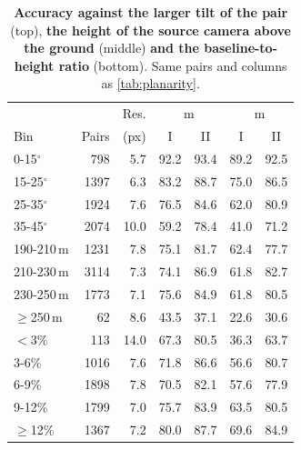\begin{table}[t]
\centering
\caption{\textbf{Accuracy against the larger tilt of the pair} (top), \textbf{the height of the source camera above the ground} (middle) \textbf{and the baseline-to-height ratio} (bottom). Same pairs and columns as \cref{tab:planarity}.}
\label{tab:planarity_tilt}
\footnotesize
\setlength{\tabcolsep}{4pt}
\begin{tabular}{@{}lrrcccc@{}}
\toprule
& & Res. & \multicolumn{2}{c}{\SRd@1\,m} & \multicolumn{2}{c}{\SRe@1\,m} \\
Bin & Pairs & (px) & I & II & I & II \\
\midrule
0-15$^\circ$ & 798 & 5.7 & 92.2 & 93.4 & 89.2 & 92.5 \\
15-25$^\circ$ & 1397 & 6.3 & 83.2 & 88.7 & 75.0 & 86.5 \\
25-35$^\circ$ & 1924 & 7.6 & 76.5 & 84.6 & 62.0 & 80.9 \\
35-45$^\circ$ & 2074 & 10.0 & 59.2 & 78.4 & 41.0 & 71.2 \\
\midrule
190-210\,m & 1231 & 7.8 & 75.1 & 81.7 & 62.4 & 77.7 \\
210-230\,m & 3114 & 7.3 & 74.1 & 86.9 & 61.8 & 82.7 \\
230-250\,m & 1773 & 7.1 & 75.6 & 84.9 & 61.8 & 80.5 \\
$\geq$250\,m & 62 & 8.6 & 43.5 & 37.1 & 22.6 & 30.6 \\
\midrule
$<$3\% & 113 & 14.0 & 67.3 & 80.5 & 36.3 & 63.7 \\
3-6\% & 1016 & 7.6 & 71.8 & 86.6 & 56.6 & 80.7 \\
6-9\% & 1898 & 7.8 & 70.5 & 82.1 & 57.6 & 77.9 \\
9-12\% & 1799 & 7.0 & 75.7 & 83.9 & 63.5 & 80.5 \\
$\geq$12\% & 1367 & 7.2 & 80.0 & 87.7 & 69.6 & 84.9 \\
\bottomrule
\end{tabular}
\end{table}

